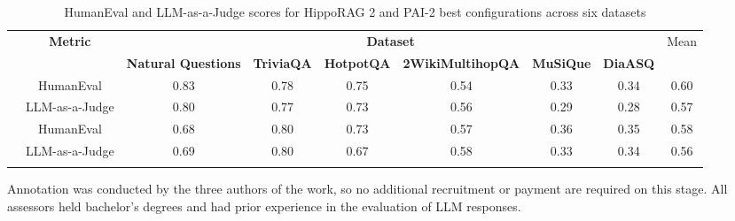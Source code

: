 \begin{table}[H]
    \centering
	\renewcommand{\arraystretch}{1.3}
    \begin{tabular}{|c|c|c|c|c|c|c|c||c|}
    \hhline{|-|-|------||-|}
    \multirow{2}{*}{\textbf{Method}} & \multirow{2}{*}{\textbf{Metric}} & \multicolumn{6}{c||}{\textbf{Dataset}} & \multirow{2}{*}{Mean} \\ 
    \hhline{|~|~|------||~|}
     &  & \textbf{Natural Questions} & \textbf{TriviaQA} & \textbf{HotpotQA} & \textbf{2WikiMultihopQA} & \textbf{MuSiQue} & \textbf{DiaASQ} &  \\ 
    \hhline{========::=}
    \multirow{2}{*}{HippoRAG 2} & HumanEval & 0.83 & 0.78 & 0.75 & 0.54 & 0.33 & 0.34 & 0.60 \\
    \hhline{|~|-|-|-|-|-|-|-||-|}
     & LLM-as-a-Judge & 0.80 & 0.77 & 0.73 & 0.56 & 0.29 & 0.28 & 0.57 \\
     \hhline{========:|=}
    \multirow{2}{*}{PAI-2} & HumanEval & 0.68 & 0.80 & 0.73 & 0.57 & 0.36 & 0.35 & 0.58 \\ \hhline{|~|-|-|-|-|-|-|-||-|}
     & LLM-as-a-Judge & 0.69 & 0.80 & 0.67 & 0.58 & 0.33 & 0.34 & 0.56 \\ 
     \hhline{|-|-|-|-|-|-|-|-||-|}
    \end{tabular}%
    \renewcommand{\arraystretch}{1}
    \caption{HumanEval and LLM-as-a-Judge scores for HippoRAG 2 and PAI-2 best configurations across six datasets}
	\label{tab:humaneval_vs_judgescores}
\end{table}

Annotation was conducted by the three authors of the work, so no additional recruitment or payment are required on this stage. All assessors held bachelor’s degrees and had prior experience in the evaluation of LLM responses.



